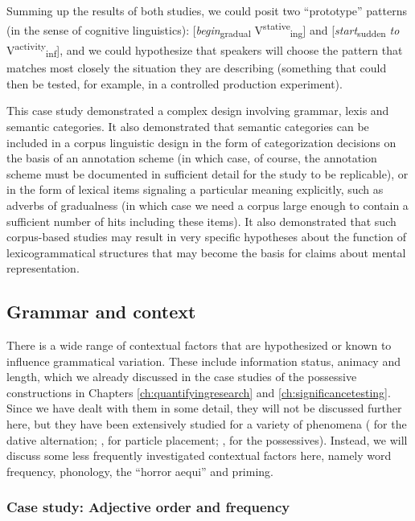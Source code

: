 Summing up the results of both studies, we could posit two ``prototype'' patterns (in the sense of cognitive linguistics): [\textit{begin}\textsubscript{gradual} V\textsuperscript{stative}\textsubscript{ing}] and [\textit{start}\textsubscript{sudden} \textit{to} V\textsuperscript{activity}\textsubscript{inf}], and we could hypothesize that speakers will choose the pattern that matches most closely the situation they are describing (something that could then be tested, for example, in a controlled production experiment).

This case study demonstrated a complex design involving grammar, lexis and semantic categories. It also demonstrated that semantic categories can be included in a corpus linguistic design in the form of categorization decisions on the basis of an annotation scheme (in which case, of course, the annotation scheme must be documented in sufficient detail for the study to be replicable), or in the form of lexical items signaling a particular meaning explicitly, such as adverbs of gradualness (in which case we need a corpus large enough to contain a sufficient number of hits including these items). It also demonstrated that such corpus-based studies may result in very specific hypotheses about the function of lexicogrammatical structures that may become the basis for claims about mental representation.

\subsection{Grammar and context}
\label{sec:grammarandcontext}

There is a wide range of contextual factors that are hypothesized or known to influence grammatical variation. These include information status, animacy and length, which we already discussed in the case studies of the possessive constructions in Chapters \ref{ch:quantifyingresearch} and \ref{ch:significancetesting}. Since we have dealt with them in some detail, they will not be discussed further here, but they have been extensively studied for a variety of phenomena (\citet[cf. e.g.][]{thompson_iconicity_1987} for the dative alternation; \citet{chen_discourse_1986}, \citet{gries_testing_2003} for particle placement; \citet{rosenbach_genitive_2002}, \citet{rohdenburg_constructional_2003} for the possessives). Instead, we will discuss some less frequently investigated contextual factors here, namely word frequency, phonology, the ``horror aequi'' and priming.

\subsubsection{Case study: Adjective order and frequency}
\label{sec:adjectiveorderandfrequency}

